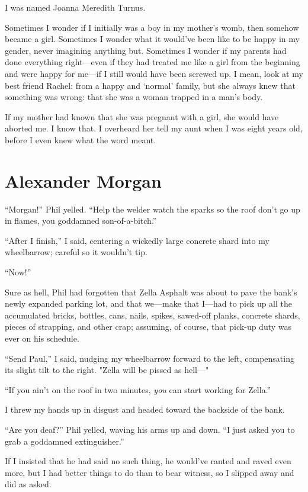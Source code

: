 I was named Joanna Meredith Turnus. ~

Sometimes I wonder if I initially was a boy in my mother's womb, then
somehow became a girl. Sometimes I wonder what it would've been like to
be happy in my gender, never imagining anything but. Sometimes I wonder
if my parents had done everything right---even if they had treated me
like a girl from the beginning and were happy for me---if I still would
have been screwed up. I mean, look at my best friend Rachel: from a
happy and `normal' family, but she always knew that something was wrong:
that she was a woman trapped in a man's body.

If my mother had known that she was pregnant with a girl, she would have
aborted me. I know that. I overheard her tell my aunt when I was eight
years old, before I even knew what the word meant.

\chapter{Alexander Morgan}

\titlemark

``Morgan!'' Phil yelled. ``Help the welder watch the sparks so the roof
don't go up in flames, you goddamned son-of-a-bitch.''

``After I finish,'' I said, centering a wickedly large concrete shard
into my wheelbarrow; careful so it wouldn't tip.

``Now!''

Sure as hell, Phil had forgotten that Zella Asphalt was about to pave
the bank's newly expanded parking lot, and that we---make that I---had
to pick up all the accumulated bricks, bottles, cans, nails, spikes,
sawed-off planks, concrete shards, pieces of strapping, and other crap;
assuming, of course, that pick-up duty was ever on his schedule.

``Send Paul,'' I said, nudging my wheelbarrow forward to the left,
compensating its slight tilt to the right. "Zella will be pissed as
hell---"

``If you ain't on the roof in two minutes, \emph{you} can start working
for Zella.''

I threw my hands up in disgust and headed toward the backside of the
bank.

``Are you deaf?'' Phil yelled, waving his arms up and down. ``I just
asked you to grab a goddamned extinguisher.''

If I insisted that he had said no such thing, he would've ranted and
raved even more, but I had better things to do than to bear witness, so
I slipped away and did as asked.

